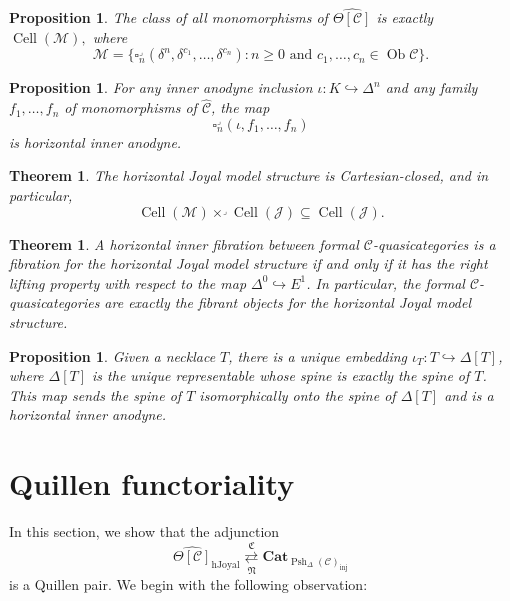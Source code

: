 \documentclass{amsart}
\numberwithin{equation}{section}
\theoremstyle{plain}   %
\newtheorem{thm}[subsection]{Theorem}
\newtheorem{prop}[subsection]{Proposition}
\theoremstyle{remark}
\theoremstyle{plain}
\DeclareMathOperator{\Ob}{Ob}
\newcommand{\Cat}{\ensuremath{\mathbf{Cat}}}
\newcommand{\psh}[1]{\ensuremath{\widehat{#1}}}
\newcommand{\C}{\ensuremath{\mathcal{C}}}
\newcommand{\cellset}{\ensuremath{\widehat{\Theta[\mathcal{C}]}}}
\newcommand{\spsh}{\ensuremath{\operatorname{Psh}_\Delta(\mathcal{C})}}
\begin{document}
\begin{prop}
	The class of all monomorphisms of \(\cellset\) is exactly \(\operatorname{Cell}(\mathscr{M}),\) where \[\mathscr{M}=\{\square_n^\lrcorner(\delta^n,\delta^{c_1},\dots,\delta^{c_n}) : n\geq 0 \text{ and } c_1,\dots,c_n \in \Ob \C\}.\]
\end{prop}

\begin{prop}
	For any inner anodyne inclusion \(\iota:K\hookrightarrow \Delta^n\) and any family \(f_1,\dots,f_n\) of monomorphisms of \(\psh{\C}\), the map \[\square^\lrcorner_n(\iota,f_1,\dots,f_n)\] is horizontal inner anodyne.
\end{prop}

\begin{thm} The horizontal Joyal model structure is Cartesian-closed, and in particular, \[\operatorname{Cell}(\mathscr{M})\times^\lrcorner \operatorname{Cell}(\mathscr{J}) \subseteq \operatorname{Cell}(\mathscr{J}).\]
\end{thm}

\begin{thm}\label{isofibrations}
	A horizontal inner fibration between formal \(\C\)-quasicategories is a fibration for the horizontal Joyal model structure if and only if it has the right lifting property with respect to the map \(\Delta^0\hookrightarrow E^1\).  In particular, the formal \(\C\)-quasicategories are exactly the fibrant objects for the horizontal Joyal model structure.
\end{thm}

\begin{prop}
	Given a necklace \(T\), there is a unique embedding \(\iota_T:T\hookrightarrow \Delta[T]\), where \(\Delta[T]\) is the unique representable whose spine is exactly the spine of \(T\).  This map sends the spine of \(T\) isomorphically onto the spine of \(\Delta[T]\) and is a horizontal inner anodyne.
\end{prop}

\section{Quillen functoriality}
In this section, we show that the adjunction \[\cellset_{\mathrm{hJoyal}} \underset{\mathfrak{N}}{\overset{\mathfrak{C}}{\rightleftarrows}} \Cat_{\spsh_{\mathrm{inj}}}\] is a Quillen pair. We begin with the following observation:
\end{document}
